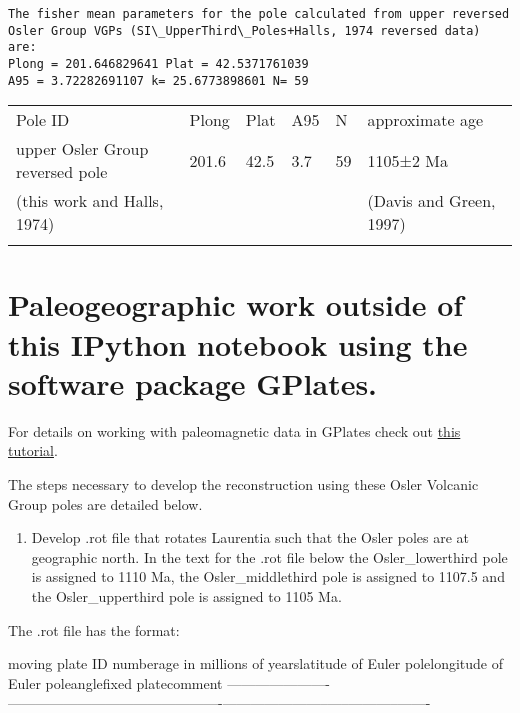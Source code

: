 \documentclass{article}
\begin{document}
    \begin{Verbatim}[commandchars=\\\{\}]
The fisher mean parameters for the pole calculated from upper reversed
Osler Group VGPs (SI\_UpperThird\_Poles+Halls, 1974 reversed data) are: 
Plong = 201.646829641 Plat = 42.5371761039
A95 = 3.72282691107 k= 25.6773898601 N= 59
    \end{Verbatim}

    \begin{longtable}[c]{@{}llllll@{}}
\hline\noalign{\medskip}
Pole ID & Plong & Plat & A95 & N & approximate age
\\\noalign{\medskip}
\hline\noalign{\medskip}
upper Osler Group reversed pole & 201.6 & 42.5 & 3.7 & 59 & 1105±2 Ma
\\\noalign{\medskip}
(this work and Halls, 1974) & & & & & (Davis and Green, 1997)
\\\noalign{\medskip}
\hline
\end{longtable}


    \section{Paleogeographic work outside of this IPython notebook using the software
package GPlates.}


    For details on working with paleomagnetic data in GPlates check out
\href{https://docs.google.com/document/pub?id=1gdgHIaC5WpjLaRZu1JwqotV8zOrgnfu_fZ3aNwQZNmU}{this
tutorial}.

The steps necessary to develop the reconstruction using these Osler
Volcanic Group poles are detailed below.

    \begin{enumerate}
\def\labelenumi{(\arabic{enumi})}
\itemsep1pt\parskip0pt
\item
  Develop .rot file that rotates Laurentia such that the Osler poles are
  at geographic north. In the text for the .rot file below the
  Osler\_lowerthird pole is assigned to 1110 Ma, the Osler\_middlethird
  pole is assigned to 1107.5 and the Osler\_upperthird pole is assigned
  to 1105 Ma.
\end{enumerate}

The .rot file has the format:

\textbar{}moving plate ID number\textbar{}age in millions of
years\textbar{}latitude of Euler pole\textbar{}longitude of Euler
pole\textbar{}angle\textbar{}fixed plate\textbar{}comment\textbar{}
\textbar{}----------------------\textbar{}------------------------\textbar{}----------------------\textbar{}-----------------------\textbar{}-----\textbar{}-----------\textbar{}-------\textbar{}
\end{document}

